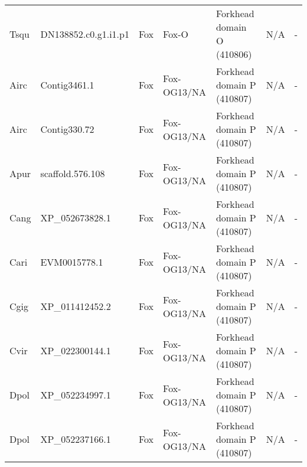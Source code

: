 \documentclass[../main.tex]{subfiles}
\begin{document}
\begin{landscape}
\begin{longtable}{lllllll}
		Tsqu           & DN138852.c0.g1.i1.p1  & Fox            & Fox-O               & Forkhead domain O (410806)                  & N/A                                                                    & -                    \\
		Airc           & Contig3461.1          & Fox            & Fox-OG13/NA         & Forkhead domain P (410807)                  & N/A                                                                    & -                    \\
		Airc           & Contig330.72          & Fox            & Fox-OG13/NA         & Forkhead domain P (410807)                  & N/A                                                                    & -                    \\
		Apur           & scaffold.576.108      & Fox            & Fox-OG13/NA         & Forkhead domain P (410807)                  & N/A                                                                    & -                    \\
		Cang           & XP\_052673828.1       & Fox            & Fox-OG13/NA         & Forkhead domain P (410807)                  & N/A                                                                    & -                    \\
		Cari           & EVM0015778.1          & Fox            & Fox-OG13/NA         & Forkhead domain P (410807)                  & N/A                                                                    & -                    \\
		Cgig           & XP\_011412452.2       & Fox            & Fox-OG13/NA         & Forkhead domain P (410807)                  & N/A                                                                    & -                    \\
		Cvir           & XP\_022300144.1       & Fox            & Fox-OG13/NA         & Forkhead domain P (410807)                  & N/A                                                                    & -                    \\
		Dpol           & XP\_052234997.1       & Fox            & Fox-OG13/NA         & Forkhead domain P (410807)                  & N/A                                                                    & -                    \\
		Dpol           & XP\_052237166.1       & Fox            & Fox-OG13/NA         & Forkhead domain P (410807)                  & N/A                                                                    & -                    \\

\end{longtable}
\end{landscape}
\end{document}
